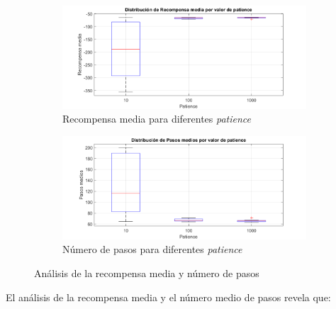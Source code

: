 \begin{figure}[H]
    \centering
    \begin{subfigure}{0.8\textwidth}
        \centering
        \includegraphics[width=\textwidth]{../../experiments/directEstimation/experiment-3/results/reward.png}
        \caption{Recompensa media para diferentes \textit{patience}}
        \label{fig:directEstimation3-subfig-reward}
    \end{subfigure}
    \hfill
    \begin{subfigure}{0.8\textwidth}
        \centering
        \includegraphics[width=\textwidth]{../../experiments/directEstimation/experiment-3/results/steps.png}
        \caption{Número de pasos para diferentes \textit{patience}}
        \label{fig:directEstimation3-subfig-steps}
    \end{subfigure}
    \caption{Análisis de la recompensa media y número de pasos}
    \label{fig:directEstimation3-reward}
\end{figure}

El análisis de la recompensa media y el número medio de pasos revela que:

